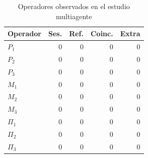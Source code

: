 \begin{table}[!t]
\caption{Operadores observados en el estudio multiagente}
\label{tab:multi_operators}
\centering\footnotesize
\begin{tabular}{lrrrr}
\hline
Operador & Ses. & Ref. & Coinc. & Extra\\
\hline
$P_1$ & 0 & 0 & 0 & 0\\
$P_2$ & 0 & 0 & 0 & 0\\
$P_3$ & 0 & 0 & 0 & 0\\
$M_1$ & 0 & 0 & 0 & 0\\
$M_2$ & 0 & 0 & 0 & 0\\
$M_3$ & 0 & 0 & 0 & 0\\
$\Pi_1$ & 0 & 0 & 0 & 0\\
$\Pi_2$ & 0 & 0 & 0 & 0\\
$\Pi_3$ & 0 & 0 & 0 & 0\\
\hline
\end{tabular}
\end{table}
